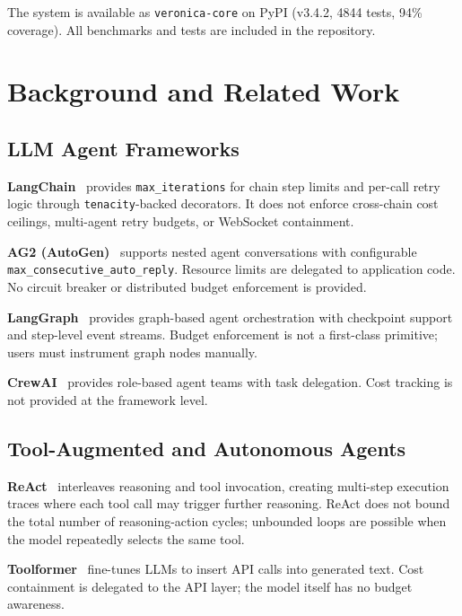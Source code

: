 \documentclass[11pt]{article}
\begin{document}
The system is available as \texttt{veronica-core} on PyPI (v3.4.2, 4844
tests, 94\% coverage). All benchmarks and tests are included in the
repository.

\section{Background and Related Work}
\label{sec:related}

\subsection{LLM Agent Frameworks}

\textbf{LangChain}~\cite{harrison2022langchain} provides
\texttt{max\_iterations} for chain step limits and per-call retry logic
through \texttt{tenacity}-backed decorators. It does not enforce cross-chain
cost ceilings, multi-agent retry budgets, or WebSocket containment.

\textbf{AG2 (AutoGen)}~\cite{wu2023autogen} supports nested agent
conversations with configurable \texttt{max\_consecutive\_auto\_reply}.
Resource limits are delegated to application code. No circuit breaker or
distributed budget enforcement is provided.

\textbf{LangGraph}~\cite{langchain2024langgraph} provides graph-based agent
orchestration with checkpoint support and step-level event streams. Budget
enforcement is not a first-class primitive; users must instrument graph nodes
manually.

\textbf{CrewAI}~\cite{moura2024crewai} provides role-based agent teams with
task delegation. Cost tracking is not provided at the framework level.

\subsection{Tool-Augmented and Autonomous Agents}

\textbf{ReAct}~\cite{yao2023react} interleaves reasoning and tool invocation,
creating multi-step execution traces where each tool call may trigger further
reasoning. ReAct does not bound the total number of reasoning-action cycles;
unbounded loops are possible when the model repeatedly selects the same tool.

\textbf{Toolformer}~\cite{schick2023toolformer} fine-tunes LLMs to insert API
calls into generated text. Cost containment is delegated to the API layer; the
model itself has no budget awareness.
\end{document}
